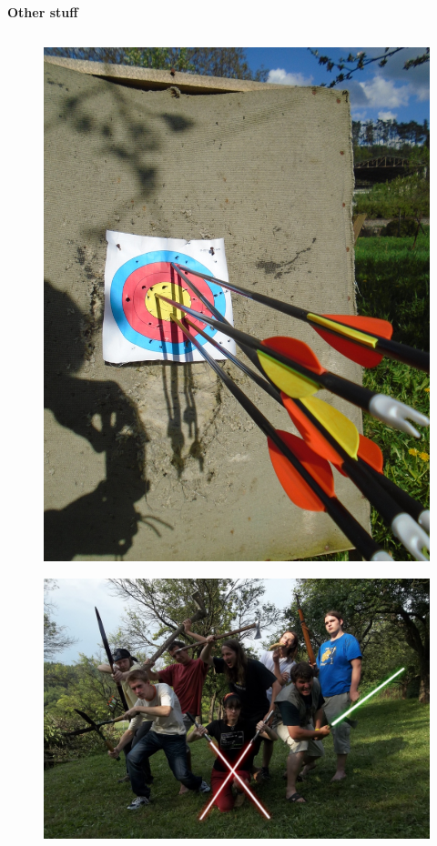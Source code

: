 \documentclass[xcolor=dvipsnames]{beamer}
\begin{document}
\begin{frame}{\bf Other stuff}

\begin{columns}
\begin{column}{0.5\textwidth}

\begin{figure}[!htb]
  \centering
  \includegraphics[scale=0.4]{../../pictures/me_03.jpg}
\end{figure}

\begin{figure}[!htb]
  \centering
  \includegraphics[scale=0.1]{../../pictures/me_04.jpg}
\end{figure}


\end{column}
\end{columns}
\end{frame}
\end{document}
